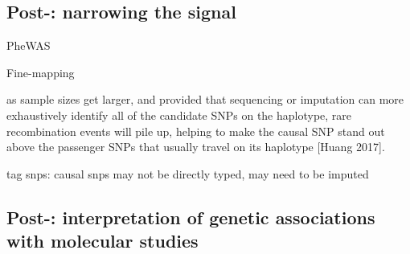 \subsection{Post-: narrowing the signal}

\begin{outline}

\1 PheWAS\autocite{verma2017CurrentScopeChallenges}

\1 Fine-mapping

    \2 as sample sizes get larger, and provided that sequencing or imputation can more exhaustively identify all of the candidate SNPs on the haplotype, rare recombination events will pile up, helping to make the causal SNP stand out above the passenger SNPs that usually travel on its haplotype [Huang 2017].

    \2 tag snps: causal snps may not be directly typed, may need to be imputed

\end{outline}

\subsection{Post-: interpretation of genetic associations with molecular studies}

